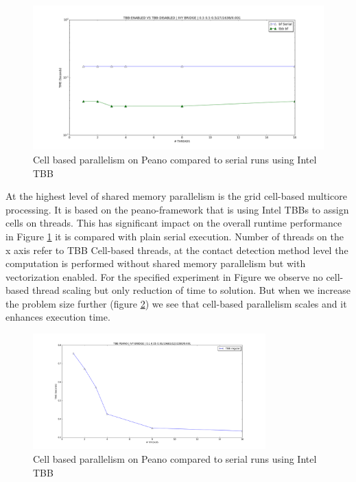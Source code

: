 \begin{figure}[htb]
  \begin{center}
    \includegraphics[width=1\textwidth]{experiments/random/omp/tbb_vs_serial.png}
  \end{center}
  \caption{Cell based parallelism on Peano compared to serial runs using Intel TBB}
  \label{figure:tbb_vs_serial}
\end{figure}
  

At the highest level of shared memory parallelism is the grid cell-based multicore processing. It is based on the peano-framework that is using Intel TBBs to assign cells on threads. This has significant impact on the overall runtime performance in Figure \ref{figure:tbb_vs_serial} it is compared with plain serial execution. Number of threads on the x axis refer to TBB Cell-based threads, at the contact detection method level the computation is performed without shared memory parallelism but with vectorization enabled. For the specified experiment in Figure {} we observe no cell-based thread scaling but only reduction of time to solution. But when we increase the problem size further (figure \ref{figure:tbb_scaling}) we see that cell-based parallelism scales and it enhances execution time. 

\begin{figure}[htb]
  \begin{center}
    \includegraphics[width=0.8\textwidth]{experiments/random/omp/tbb_regular_x2.png}
  \end{center}
  \caption{Cell based parallelism on Peano compared to serial runs using Intel TBB}
  \label{figure:tbb_scaling}
\end{figure}

